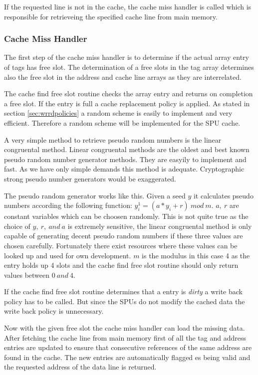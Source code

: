 \documentclass[DIV10, abstracton, openright, footsepline, headsepline, twoside, 9pt,
bigheadings]{scrreprt}
\begin{document}
If the requested line is not in the cache, the cache miss handler is called
which is  responsible for retrieveing the specified cache line from
main memory.

\subsubsection{Cache Miss Handler}
The first step of the cache miss handler is to determine if the actual array entry
of tags has free slot. The determination of a free slots in the tag array
determines also the free slot in the address and cache line arrays as they are
interrelated.

The cache find free slot routine checks the array entry and returns on
completion a free slot. If the entry is full a cache replacement policy
is applied. As stated in section \ref{sec:wrrdpolicies} a random scheme is easily
to implement and very efficient. Therefore a random scheme will be implemented
for the SPU cache.

A very simple method to retrieve pseudo random numbers is the linear congruental
method. Linear congruental methods are the oldest and best known pseudo random
number generator methods. They are easyily to implement and fast. As we have only
simple demands this method is adequate. Cryptographic strong pseudo
number generators would be exaggerated.

The pseudo random generator works like this. Given a seed $y$ it calculates pseudo
numbers
according the following function: $y_i^1 = (a * y_i + r)\ mod\ m$. $a,\ r$ are
constant variables which can be choosen randomly. This is not quite true as the
choice of $y, \ r, \ and\ a$ is extremely sensitive, the linear congruental
method is only capable of generating decent pseudo random numbers if these three
values are chosen carefully. Fortunately there exist resources where these
values can be looked up and used for own development. $m$ is the modulus \- in this
case 4 as the entry holds up 4 slots and the cache find free slot routine
should only return values between $0\ and\ 4$.

If the cache find free slot routine determines that a entry is \textit{dirty}
a write back policy has to be called. But since the SPUs do not modify the cached
data the write back policy is unnecessary.

Now with the given free slot the cache miss handler can load the missing data.
After fetching the cache line from main memory first of all the tag and address
entries are updated to ensure that consecutive references of the same address
are found in the cache. The new entries are automatically flagged es being valid
and the requested address of the data line is returned.
\end{document}
